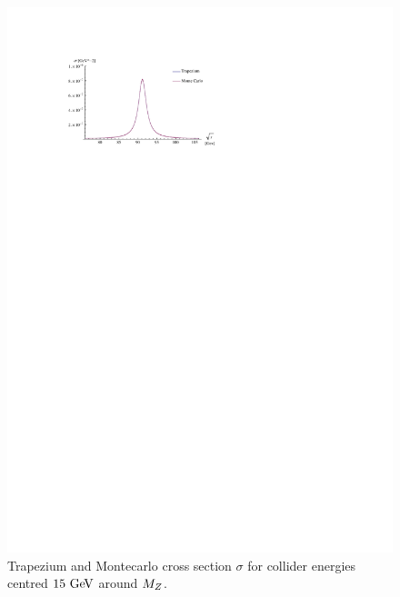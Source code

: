 \documentclass[]{article}
\begin{document}
\begin{figure}[H]
	\vspace{10pt}
	\hspace*{-0.1\textwidth}
	\centering
	\label{fig:bothcombinedfocused}
	\includegraphics[width=1.2\textwidth]{both_combined_focused}
	\caption{Trapezium and Montecarlo cross section $\sigma$ for collider energies centred $15\GeV$ around $M_{Z }$.}
	\label{fig:bothfocused}
\end{figure}
\end{document}
